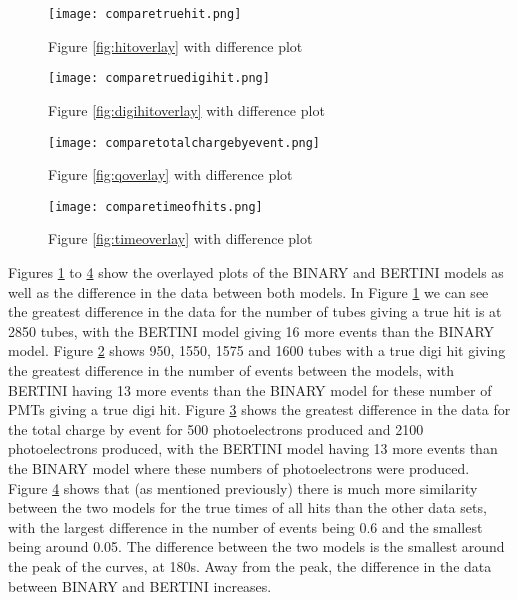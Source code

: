 \documentclass[11pt,oneside,a4paper]{article}
\begin{document}
\begin{figure}
	\centering
	\captionsetup{justification=centering}
	\texttt{[image: comparetruehit.png]}
	\caption{Figure \ref{fig:hitoverlay} with difference plot}
	\label{fig:hitdiff}
\end{figure}

\begin{figure}
	\centering
	\captionsetup{justification=centering}
	\texttt{[image: comparetruedigihit.png]}
	\caption{Figure \ref{fig:digihitoverlay} with difference plot}
	\label{fig:digihitdiff}
\end{figure}

\begin{figure}
	\centering
	\captionsetup{justification=centering}
	\texttt{[image: comparetotalchargebyevent.png]}
	\caption{Figure \ref{fig:qoverlay} with difference plot}
	\label{fig:qdiff}
\end{figure}

\begin{figure}
	\centering
	\captionsetup{justification=centering}
	\texttt{[image: comparetimeofhits.png]}
	\caption{Figure \ref{fig:timeoverlay} with difference plot}
	\label{fig:timediff}
\end{figure}


 Figures \ref{fig:hitdiff} to \ref{fig:timediff} show the overlayed plots of the BINARY and BERTINI models as well as the difference in the data between both models. In Figure \ref{fig:hitdiff} we can see the greatest difference in the data for the number of tubes giving a true hit is at 2850 tubes, with the BERTINI model giving 16 more events than the BINARY model. Figure \ref{fig:digihitdiff} shows 950, 1550, 1575 and 1600 tubes with a true digi hit giving the greatest difference in the number of events between the models, with BERTINI having 13 more events than the BINARY model for these number of PMTs giving a true digi hit. Figure \ref{fig:qdiff} shows the greatest difference in the data for the total charge by event for 500 photoelectrons produced and 2100 photoelectrons produced, with the BERTINI model having 13 more events than the BINARY model where these numbers of photoelectrons were produced. Figure \ref{fig:timediff} shows that (as mentioned previously) there is much more similarity between the two models for the true times of all hits than the other data sets, with the largest difference in the number of events being 0.6 and the smallest being around 0.05. The difference between the two models is the smallest around the peak of the curves, at 180s. Away from the peak, the difference in the data between BINARY and BERTINI increases.
\end{document}
